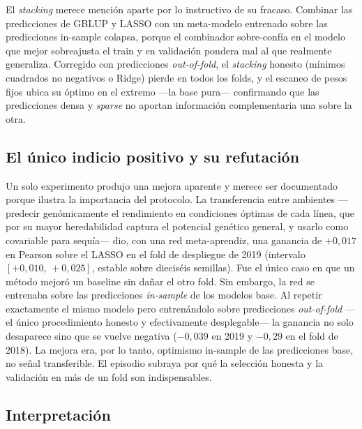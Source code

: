 El \emph{stacking} merece mención aparte por lo instructivo de su fracaso. Combinar las
predicciones de GBLUP y LASSO con un meta-modelo entrenado sobre las predicciones
in-sample colapsa, porque el combinador sobre-confía en el modelo que mejor sobreajusta el
train y en validación pondera mal al que realmente generaliza. Corregido con predicciones
\emph{out-of-fold}, el \emph{stacking} honesto (mínimos cuadrados no negativos o Ridge)
pierde en todos los folds, y el escaneo de pesos fijos ubica su óptimo en el extremo —la
base pura— confirmando que las predicciones densa y \emph{sparse} no aportan información
complementaria una sobre la otra.

\subsection{El único indicio positivo y su refutación}

Un solo experimento produjo una mejora aparente y merece ser documentado porque ilustra la
importancia del protocolo. La transferencia entre ambientes —predecir genómicamente el
rendimiento en condiciones óptimas de cada línea, que por su mayor heredabilidad captura el
potencial genético general, y usarlo como covariable para sequía— dio, con una red
meta-aprendiz, una ganancia de $+0{,}017$ en Pearson sobre el LASSO en el fold de
despliegue de 2019 (intervalo $[+0{,}010,\,+0{,}025]$, estable sobre dieciséis semillas).
Fue el único caso en que un método mejoró un baseline sin dañar el otro fold. Sin embargo,
la red se entrenaba sobre las predicciones \emph{in-sample} de los modelos base. Al repetir
exactamente el mismo modelo pero entrenándolo sobre predicciones \emph{out-of-fold} —el
único procedimiento honesto y efectivamente desplegable— la ganancia no solo desaparece
sino que se vuelve negativa ($-0{,}039$ en 2019 y $-0{,}29$ en el fold de 2018). La mejora
era, por lo tanto, optimismo in-sample de las predicciones base, no señal transferible. El
episodio subraya por qué la selección honesta y la validación en más de un fold son
indispensables.

\subsection{Interpretación}

